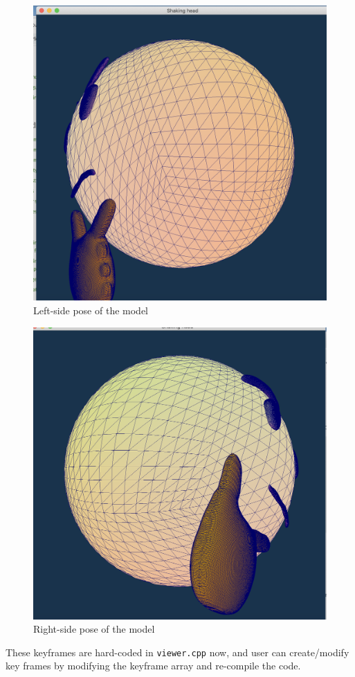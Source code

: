 \documentclass[acmtog]{acmart}
\begin{document}
\begin{figure}[h]
	\begin{center}
		\includegraphics[scale=0.17]{left.png}
	\end{center}
	\caption{Left-side pose of the model}
\end{figure}
\begin{figure}[h]
	\begin{center}
		\includegraphics[scale=0.17]{right.png}
	\end{center}
	\caption{Right-side pose of the model}
\end{figure}
These keyframes are hard-coded in \texttt{viewer.cpp} now, and user can create/modify key frames 
by modifying the keyframe array and re-compile the code.
\end{document}
